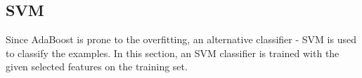 
\subsection{SVM}
Since AdaBoost is prone to the overfitting, an alternative classifier - SVM is used to classify the examples. In this section, an SVM classifier is trained with the given selected features on the training set.

